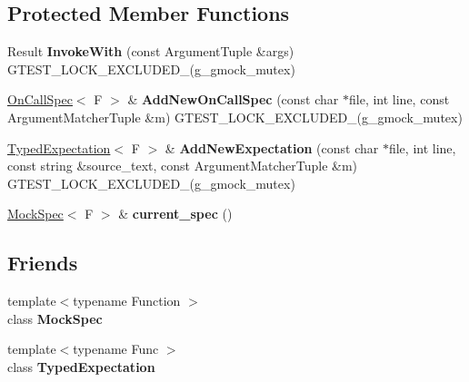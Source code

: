 \subsection*{Protected Member Functions}
\begin{DoxyCompactItemize}
\item 
\mbox{\label{classtesting_1_1internal_1_1_function_mocker_base_a869ec713f000b4e7829c660efc25e8cd}} 
Result {\bfseries Invoke\+With} (const Argument\+Tuple \&args) G\+T\+E\+S\+T\+\_\+\+L\+O\+C\+K\+\_\+\+E\+X\+C\+L\+U\+D\+E\+D\+\_\+(g\+\_\+gmock\+\_\+mutex)
\item 
\mbox{\label{classtesting_1_1internal_1_1_function_mocker_base_a22ece3b6e8d24f11d8f4ba9c17b737c4}} 
\mbox{\hyperlink{classtesting_1_1internal_1_1_on_call_spec}{On\+Call\+Spec}}$<$ F $>$ \& {\bfseries Add\+New\+On\+Call\+Spec} (const char $\ast$file, int line, const Argument\+Matcher\+Tuple \&m) G\+T\+E\+S\+T\+\_\+\+L\+O\+C\+K\+\_\+\+E\+X\+C\+L\+U\+D\+E\+D\+\_\+(g\+\_\+gmock\+\_\+mutex)
\item 
\mbox{\label{classtesting_1_1internal_1_1_function_mocker_base_aa2c35c565f08d3649436af443ece468f}} 
\mbox{\hyperlink{classtesting_1_1internal_1_1_typed_expectation}{Typed\+Expectation}}$<$ F $>$ \& {\bfseries Add\+New\+Expectation} (const char $\ast$file, int line, const string \&source\+\_\+text, const Argument\+Matcher\+Tuple \&m) G\+T\+E\+S\+T\+\_\+\+L\+O\+C\+K\+\_\+\+E\+X\+C\+L\+U\+D\+E\+D\+\_\+(g\+\_\+gmock\+\_\+mutex)
\item 
\mbox{\label{classtesting_1_1internal_1_1_function_mocker_base_a744318106e20b346f4f1efbf5a601644}} 
\mbox{\hyperlink{classtesting_1_1internal_1_1_mock_spec}{Mock\+Spec}}$<$ F $>$ \& {\bfseries current\+\_\+spec} ()
\end{DoxyCompactItemize}
\subsection*{Friends}
\begin{DoxyCompactItemize}
\item 
\mbox{\label{classtesting_1_1internal_1_1_function_mocker_base_ae72aeee91c93e8ae5e1ed7f726a766b2}} 
{\footnotesize template$<$typename Function $>$ }\\class {\bfseries Mock\+Spec}
\item 
\mbox{\label{classtesting_1_1internal_1_1_function_mocker_base_a4f17de55396a8ef740d5ad2b1380a851}} 
{\footnotesize template$<$typename Func $>$ }\\class {\bfseries Typed\+Expectation}
\end{DoxyCompactItemize}
